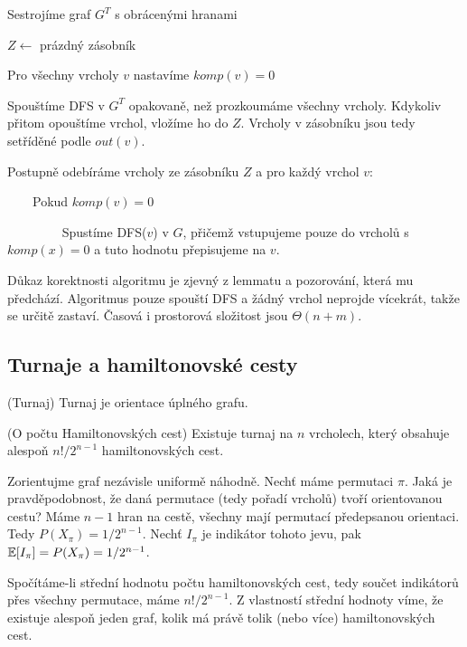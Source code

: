 \begin{enumerate*}
\item Sestrojíme graf $G^T$ s obrácenými hranami
\item $Z \leftarrow$ prázdný zásobník
\item Pro všechny vrcholy $v$ nastavíme $komp(v) = 0$
\item Spouštíme DFS v $G^T$ opakovaně, než prozkoumáme všechny vrcholy. Kdykoliv přitom opouštíme vrchol, vložíme ho do $Z$. Vrcholy v zásobníku jsou tedy setříděné podle $out(v)$.
\item Postupně odebíráme vrcholy ze zásobníku $Z$ a pro každý vrchol $v$:
\item $\qquad$Pokud $komp(v) = 0$
\leftmargin=6cm
\indent
\item $\qquad\qquad$ Spustíme DFS($v$) v $G$, přičemž vstupujeme pouze do vrcholů s $komp(x) = 0$ a tuto hodnotu přepisujeme na $v$.
\end{enumerate*}

\dk Důkaz korektnosti algoritmu je zjevný z lemmatu a pozorování, která mu předchází. Algoritmus pouze spouští DFS a žádný vrchol neprojde vícekrát, takže se určitě zastaví. Časová i prostorová složitost jsou $\Theta(n+m)$.

\subsection{Turnaje a hamiltonovské cesty}

\df (Turnaj) Turnaj je orientace úplného grafu.

\vt (O počtu Hamiltonovských cest) Existuje turnaj na $n$ vrcholech, který 
obsahuje alespoň $n!/2^{n-1}$ hamiltonovských cest.

\dk Zorientujme graf nezávisle uniformě náhodně. Nechť máme permutaci $\pi$.  
Jaká je pravděpodobnost, že daná permutace (tedy pořadí vrcholů) tvoří 
orientovanou cestu? Máme $n-1$ hran na cestě, všechny mají permutací 
předepsanou orientaci. Tedy $P(X_\pi)= 1/2^{n-1}$. Nechť $I_\pi$ je indikátor 
tohoto jevu, pak $\mathbb{E}[I_\pi] = P(X_\pi) = 1/2^{n-1}$.

Spočítáme-li střední hodnotu počtu hamiltonovských cest, tedy součet indikátorů 
přes všechny permutace, máme $n!/2^{n-1}$. Z vlastností střední hodnoty víme, 
že existuje alespoň jeden graf, kolik má právě tolik (nebo více) 
hamiltonovských cest.
